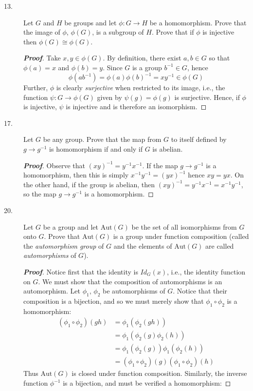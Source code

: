 \documentclass[12pt,leqno]{book}
\theoremstyle{definition}
\newenvironment{Proof}{\begin{proof}[\textnormal{\textbf{Proof}}]}{\end{proof}}
\begin{document}
\begin{description}
\begin{description}
  \item [13.] Let $G$ and $H$ be groups and let $\phi:G\to H$ be a homomorphism. Prove that the image of $\phi$, $\phi(G)$, is a subgroup of $H$. Prove that if $\phi$ is injective then $\phi(G)\cong\phi(G)$.
  \begin{Proof}
   Take $x,y\in\phi(G)$. By definition, there exist $a,b\in G$ so that $\phi(a)=x$ and $\phi(b)=y$. Since $G$ is a group $b^{-1}\in G$, hence \[\phi(ab^{-1})=\phi(a)\phi(b)^{-1}=xy^{-1}\in\phi(G)\] Further, $\phi$ is clearly \textit{surjective} when restricted to its image, i.e., the function $\psi:G\to\phi(G)$ given by $\psi(g)=\phi(g)$ is surjective. Hence, if $\phi$ is injective, $\psi$ is injective and is therefore an isomorphism.
  \end{Proof}

  \item [17.] Let $G$ be any group. Prove that the map from $G$ to itself defined by $g\to g^{-1}$ is homomorphism if and only if $G$ is abelian.
  \begin{Proof}
   Observe that $(xy)^{-1}=y^{-1}x^{-1}$. If the map $g\to g^{-1}$ is a homomorphism, then this is simply $x^{-1}y^{-1}=(yx)^{-1}$ hence $xy=yx$. On the other hand, if the group is abelian, then $(xy)^{-1}=y^{-1}x^{-1}=x^{-1}y^{-1}$, so the map $g\to g^{-1}$ is a homomorphism.
  \end{Proof}
  \item [20.] Let $G$ be a group and let $\text{Aut}(G)$ be the set of all isomorphisms from $G$ onto $G$. Prove that $\text{Aut}(G)$ is a group under function composition (called the \textit{automorphism group} of $G$ and the elements of $\text{Aut}(G)$ are called \textit{automorphisms} of $G$).
  \begin{Proof}
   Notice first that the identity is $Id_G(x)$, i.e., the identity function on $G$. We must show that the composition of automorphisms is an automorphism. Let $\phi_1$, $\phi_2$ be automorphisms of $G$. Notice that their composition is a bijection, and so we must merely show that $\phi_1\circ\phi_2$ is a homomorphism:\begin{align*}(\phi_1\circ\phi_2)(gh)&=\phi_1(\phi_2(gh))\\&=\phi_1(\phi_2(g)\phi_2(h))\\&=\phi_1(\phi_2(g))\phi_1(\phi_2(h))\\&=(\phi_1\circ\phi_2)(g)(\phi_1\circ\phi_2)(h)\end{align*} Thus $\text{Aut}(G)$ is closed under function composition. Similarly, the inverse function $\phi^{-1}$ is a bijection, and must be verified a homomorphism:


\end{Proof}
\end{description}
\end{description}
\end{document}

